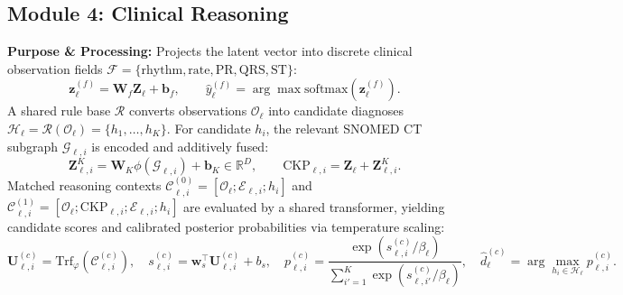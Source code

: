 \documentclass{ssnreview}
\begin{document}
\subsection{Module 4: Clinical Reasoning}
\textbf{Purpose \& Processing:} Projects the latent vector into discrete clinical observation
fields $\mathcal{F} = \{\text{rhythm}, \text{rate}, \text{PR}, \text{QRS}, \text{ST}\}$:
\begin{equation}
  \mathbf{z}_\ell^{(f)} = \mathbf{W}_f\mathbf{Z}_\ell + \mathbf{b}_f, \qquad
  \hat{y}_\ell^{(f)} = \arg\max \mathrm{softmax}(\mathbf{z}_\ell^{(f)}).
\end{equation}
A shared rule base $\mathcal{R}$ converts observations $\mathcal{O}_\ell$ into candidate
diagnoses $\mathcal{H}_\ell = \mathcal{R}(\mathcal{O}_\ell) = \{h_1,\dots,h_K\}$. For candidate
$h_i$, the relevant SNOMED CT subgraph $\mathcal{G}_{\ell,i}$ is encoded and additively fused:
\begin{equation}
  \mathbf{Z}_{\ell,i}^K = \mathbf{W}_K\phi(\mathcal{G}_{\ell,i}) + \mathbf{b}_K \in \mathbb{R}^D, \qquad
  \mathrm{CKP}_{\ell,i} = \mathbf{Z}_\ell + \mathbf{Z}_{\ell,i}^K.
\end{equation}
Matched reasoning contexts $\mathcal{C}_{\ell,i}^{(0)} = [\mathcal{O}_\ell; \mathcal{E}_{\ell,i}; h_i]$
and $\mathcal{C}_{\ell,i}^{(1)} = [\mathcal{O}_\ell; \mathrm{CKP}_{\ell,i}; \mathcal{E}_{\ell,i}; h_i]$
are evaluated by a shared transformer, yielding candidate scores and calibrated posterior
probabilities via temperature scaling:
\begin{equation}
  \mathbf{U}_{\ell,i}^{(c)} = \mathrm{Trf}_\varphi(\mathcal{C}_{\ell,i}^{(c)}), \quad
  s_{\ell,i}^{(c)} = \mathbf{w}_s^\top \mathbf{U}_{\ell,i}^{(c)} + b_s, \quad
  p_{\ell,i}^{(c)} = \frac{\exp(s_{\ell,i}^{(c)}/\beta_\ell)}{\sum_{i'=1}^K \exp(s_{\ell,i'}^{(c)}/\beta_\ell)}, \quad
  \hat{d}_\ell^{(c)} = \arg\max_{h_i\in\mathcal{H}_\ell} p_{\ell,i}^{(c)}.
\end{equation}
\end{document}
